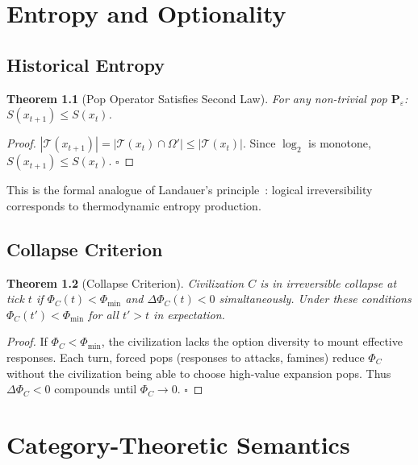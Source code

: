 \documentclass[11pt,a4paper,openany]{book}
\theoremstyle{plain}
\newtheorem{theorem}{Theorem}[chapter]
\theoremstyle{definition}
\theoremstyle{remark}
\begin{document}
\chapter{Entropy and Optionality}
\label{app:entropy}

\section{Historical Entropy}

\begin{theorem}[Pop Operator Satisfies Second Law]
  For any non-trivial pop $\mathbf{P}_\varepsilon$:
  $S(x_{t+1}) \leq S(x_t)$.
\end{theorem}
\begin{proof}
  $|\mathcal{T}(x_{t+1})| = |\mathcal{T}(x_t) \cap \Omega'|
  \leq |\mathcal{T}(x_t)|$. Since $\log_2$ is monotone,
  $S(x_{t+1}) \leq S(x_t)$. $\square$
\end{proof}

This is the formal analogue of Landauer's principle~\cite{Landauer}:
logical irreversibility corresponds to thermodynamic entropy production.

\section{Collapse Criterion}

\begin{theorem}[Collapse Criterion]
  Civilization $C$ is in irreversible collapse at tick $t$ if
  $\Phi_C(t) < \Phi_{\min}$ and $\Delta\Phi_C(t) < 0$ simultaneously.
  Under these conditions $\Phi_C(t') < \Phi_{\min}$ for all $t' > t$
  in expectation.
\end{theorem}
\begin{proof}
  If $\Phi_C < \Phi_{\min}$, the civilization lacks the option diversity
  to mount effective responses. Each turn, forced pops (responses to
  attacks, famines) reduce $\Phi_C$ without the civilization being able
  to choose high-value expansion pops. Thus $\Delta\Phi_C < 0$ compounds
  until $\Phi_C \to 0$. $\square$
\end{proof}

\chapter{Category-Theoretic Semantics}
\label{app:category}
\end{document}
